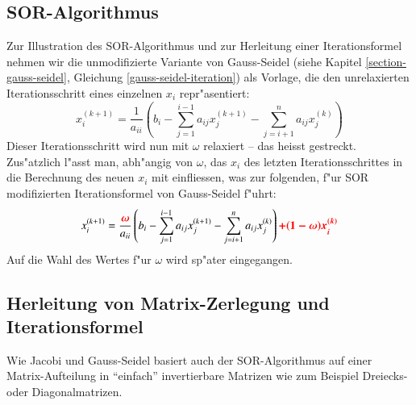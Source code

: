 \begin{refsection}
\section{SOR-Algorithmus\label{sec: SOR-Alg.}}
Zur Illustration des SOR-Algorithmus und zur Herleitung einer
Iterationsformel nehmen wir die unmodifizierte Variante von
Gauss-Seidel (siehe Kapitel \ref{section-gauss-seidel}, Gleichung
\ref{gauss-seidel-iteration}) als Vorlage, die den unrelaxierten
Iterationsschritt eines einzelnen $x_i$ repr"asentiert:
\begin{equation} \label{eq: G.-S.-It.formel}
	x_i^{(k+1)} = \frac{1}{a_{ii}}\left(b_i-\sum\limits_{j=1}^{i-1} a_{ij}x_j^{(k+1)}-\sum\limits_{j=i+1}^na_{ij}x_j^{(k)}\right)
\end{equation}
Dieser Iterationsschritt wird nun mit $\omega$ relaxiert -- das heisst
gestreckt. Zus"atzlich l"asst man, abh"angig von $\omega$, das $x_i$
des letzten Iterationsschrittes in die Berechnung des neuen $x_i$ mit
einfliessen, was zur folgenden, f"ur SOR modifizierten Iterationsformel
von Gauss-Seidel f"uhrt:
\begin{equation} \label{eq: SOR-It.formel1}
	x_i^{(k+1)} = \frac{\boldsymbol{\textcolor{red}{\omega}}}{a_{ii}}\left(b_i-\sum\limits_{j=1}^{i-1}a_{ij}x_j^{(k+1)}-\sum\limits_{j=i+1}^n a_{ij}x_j^{(k)}\right)\boldsymbol{\textcolor{red}{+(1-\omega)x_i^{(k)}}}
\end{equation}
Auf die Wahl des Wertes f"ur $\omega$ wird sp"ater eingegangen.
		
\subsection{Herleitung von Matrix-Zerlegung und Iterationsformel \label{subsec: SOR-Herleitung}}
Wie Jacobi und Gauss-Seidel basiert auch der SOR-Algorithmus auf einer
Matrix-Aufteilung in ``einfach'' invertierbare Matrizen wie zum Beispiel
Dreiecks- oder Diagonalmatrizen.


\end{refsection}
